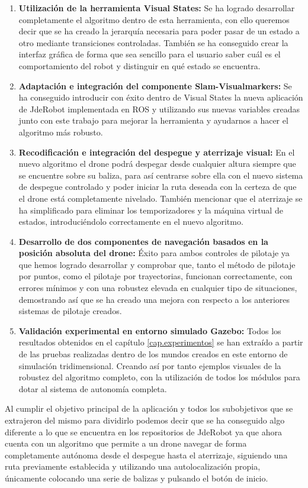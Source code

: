 \begin{enumerate}
	\item{\textbf{Utilización de la herramienta Visual States:} Se ha logrado desarrollar completamente el algoritmo dentro de esta herramienta, con ello queremos decir que se ha creado la jerarquía necesaria para poder pasar de un estado a otro mediante transiciones controladas. También se ha conseguido crear la interfaz gráfica de forma que sea sencillo para el usuario saber cuál es el comportamiento del robot y distinguir en qué estado se encuentra.}
	\item{\textbf{Adaptación e integración del componente Slam-Visualmarkers:} Se ha conseguido introducir con éxito dentro de Visual States la nueva aplicación de JdeRobot implementada en ROS y utilizando sus nuevas variables creadas junto con este trabajo para mejorar la herramienta y ayudarnos a hacer el algoritmo más robusto.}	
	\item{\textbf{Recodificación e integración del despegue y aterrizaje visual:} En el nuevo algoritmo el drone podrá despegar desde cualquier altura siempre que se encuentre sobre su baliza, para así centrarse sobre ella con el nuevo sistema de despegue controlado y poder iniciar la ruta deseada con la certeza de que el drone está completamente nivelado. También mencionar que el aterrizaje se ha simplificado para eliminar los temporizadores y la máquina virtual de estados, introduciéndolo correctamente en el nuevo algoritmo.}
	\item{\textbf{Desarrollo de dos componentes de navegación basados en la posición absoluta del drone:} Éxito para ambos controles de pilotaje ya que hemos logrado desarrollar y comprobar que, tanto el método de pilotaje por puntos, como el pilotaje por trayectorias, funcionan correctamente, con errores mínimos y con una robustez elevada en cualquier tipo de situaciones, demostrando así que se ha creado una mejora con respecto a los anteriores sistemas de pilotaje creados.}
	\item{\textbf{Validación experimental en entorno simulado Gazebo:} Todos los resultados obtenidos en el capítulo \ref{cap.experimentos} se han extraído a partir de las pruebas realizadas dentro de los mundos creados en este entorno de simulación tridimensional. Creando así por tanto ejemplos visuales de la robustez del algoritmo completo, con la utilización de todos los módulos para dotar al sistema de autonomía completa.}
\end{enumerate}

\hspace{1cm} Al cumplir el objetivo principal de la aplicación y todos los subobjetivos que se extrajeron del mismo para dividirlo podemos decir que se ha conseguido algo diferente a lo que se encuentra en los repositorios de JdeRobot ya que ahora cuenta con un algoritmo que permite a un drone navegar de forma completamente autónoma desde el despegue hasta el aterrizaje, siguiendo una ruta previamente establecida y utilizando una autolocalización propia, únicamente colocando una serie de balizas y pulsando el botón de inicio.

